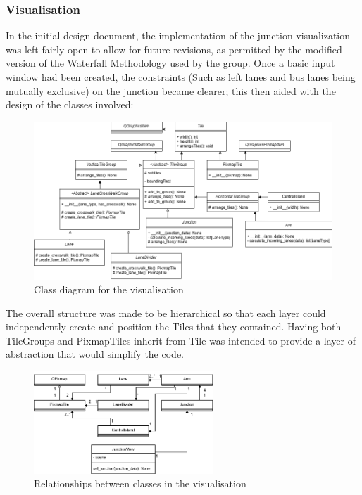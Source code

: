 \documentclass{article}
\begin{document}
        \subsubsection{Visualisation}
            In the initial design document, the implementation of the junction visualization was left fairly open to allow for future revisions, as permitted by the 
            modified version of the Waterfall Methodology used by the group. Once a basic input window had been created, the constraints (Such as left lanes and bus 
            lanes being mutually exclusive) on the junction became clearer; this then aided with the design of the classes involved:
            \begin{figure}[H]
                \centering
                \includegraphics[width=\textwidth]{visualisation_class.png}
                \caption{Class diagram for the visualisation}
                \label{fig:visualisation_class}
            \end{figure}
            The overall structure was made to be hierarchical so that each layer could independently create and position the Tiles that they contained. Having both 
            TileGroups and PixmapTiles inherit from Tile was intended to provide a layer of abstraction that would simplify the code.
            \begin{figure}[H]
                \centering
                \includegraphics[width=0.6\textwidth]{visualisation_relationship.png}
                \caption{Relationships between classes in the visualisation}
                \label{fig:visualisation_relationship}
            \end{figure}
\end{document}
